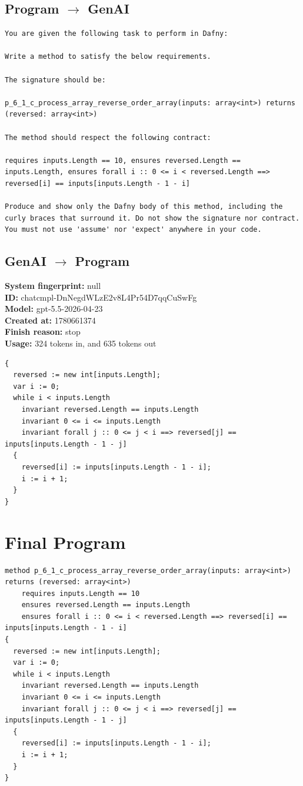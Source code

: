 \documentclass{article}
\begin{document}
\subsection*{Program $\rightarrow$ GenAI}
\begin{lstlisting}
You are given the following task to perform in Dafny:

Write a method to satisfy the below requirements.

The signature should be:

p_6_1_c_process_array_reverse_order_array(inputs: array<int>) returns (reversed: array<int>)

The method should respect the following contract:

requires inputs.Length == 10, ensures reversed.Length == inputs.Length, ensures forall i :: 0 <= i < reversed.Length ==> reversed[i] == inputs[inputs.Length - 1 - i]

Produce and show only the Dafny body of this method, including the curly braces that surround it. Do not show the signature nor contract. You must not use 'assume' nor 'expect' anywhere in your code.
\end{lstlisting}
\subsection*{GenAI $\rightarrow$ Program}
\textbf{System fingerprint: }null
\\\textbf{ID: }chatcmpl-DnNegdWLzE2v8L4Pr54D7qqCuSwFg
\\\textbf{Model: }gpt-5.5-2026-04-23
\\\textbf{Created at: }1780661374
\\\textbf{Finish reason: }stop
\\\textbf{Usage: }324 tokens in, and 635 tokens out
\begin{lstlisting}
{
  reversed := new int[inputs.Length];
  var i := 0;
  while i < inputs.Length
    invariant reversed.Length == inputs.Length
    invariant 0 <= i <= inputs.Length
    invariant forall j :: 0 <= j < i ==> reversed[j] == inputs[inputs.Length - 1 - j]
  {
    reversed[i] := inputs[inputs.Length - 1 - i];
    i := i + 1;
  }
}
\end{lstlisting}
\section*{Final Program}
\begin{lstlisting}
method p_6_1_c_process_array_reverse_order_array(inputs: array<int>) returns (reversed: array<int>)
	requires inputs.Length == 10
	ensures reversed.Length == inputs.Length
	ensures forall i :: 0 <= i < reversed.Length ==> reversed[i] == inputs[inputs.Length - 1 - i]
{
  reversed := new int[inputs.Length];
  var i := 0;
  while i < inputs.Length
    invariant reversed.Length == inputs.Length
    invariant 0 <= i <= inputs.Length
    invariant forall j :: 0 <= j < i ==> reversed[j] == inputs[inputs.Length - 1 - j]
  {
    reversed[i] := inputs[inputs.Length - 1 - i];
    i := i + 1;
  }
}
\end{lstlisting}
\end{document}
